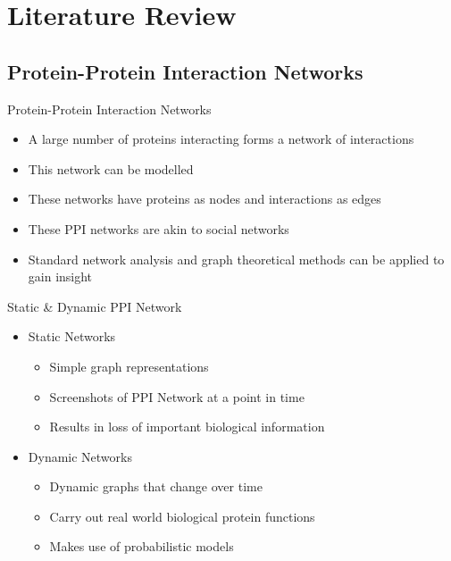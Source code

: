\documentclass[aspectratio=169]{beamer}
\begin{document}
\section{Literature Review}
\subsection{Protein-Protein Interaction Networks}
\begin{frame}{Protein-Protein Interaction Networks}
\begin{itemize}
    \item A large number of proteins interacting forms a network of interactions 
    \item This network can be modelled
    \item These networks have proteins as nodes and interactions as edges 
    \item These PPI networks are akin to social networks
    \item Standard network analysis and graph theoretical methods can be applied 
    to gain insight
\end{itemize}
\end{frame}

\begin{frame}{Static \& Dynamic PPI Network}
\begin{itemize}
    \item Static Networks 
    \begin{itemize}
        \item Simple graph representations
        \item Screenshots of PPI Network at a point in time
        \item Results in loss of important biological information
    \end{itemize}
    \item Dynamic Networks
    \begin{itemize}
        \item Dynamic graphs that change over time
        \item Carry out real world biological protein functions
        \item Makes use of probabilistic models
    \end{itemize}
\end{itemize}
    
\end{frame}
\end{document}
